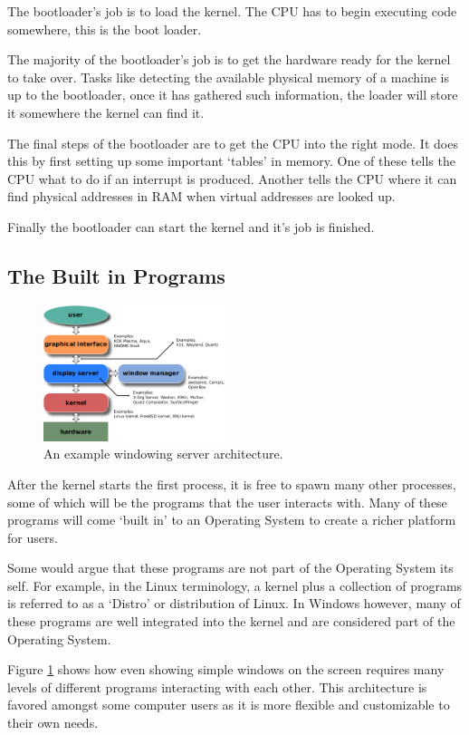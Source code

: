 \documentclass[a4paper]{report}
\begin{document}
The bootloader's job is to load the kernel. The CPU has to begin executing code somewhere, this is the boot loader.

The majority of the bootloader's job is to get the hardware ready for the kernel to take over. Tasks like detecting the available physical memory of a machine is up to the bootloader, once it has gathered such information, the loader will store it somewhere the kernel can find it.

The final steps of the bootloader are to get the CPU into the right mode. It does this by first setting up some important `tables' in memory. One of these tells the CPU what to do if an interrupt is produced. Another tells the CPU where it can find physical addresses in RAM when virtual addresses are looked up.

Finally the bootloader can start the kernel and it's job is finished.

\subsection{The Built in Programs}

\begin{figure}
\centering
\includegraphics[width=200px]{images/windowing}
\caption{An example windowing server architecture.}
\label{fig:theserver}
\end{figure}

After the kernel starts the first process, it is free to spawn many other processes, some of which will be the programs that the user interacts with. Many of these programs will come `built in' to an Operating System to create a richer platform for users.

Some would argue that these programs are not part of the Operating System its self. For example, in the Linux terminology, a kernel plus a collection of programs is referred to as a `Distro' or distribution of Linux. In Windows however, many of these programs are well integrated into the kernel and are considered part of the Operating System.

Figure \ref{fig:theserver} shows how even showing simple windows on the screen requires many levels of different programs interacting with each other. This architecture is favored amongst some computer users as it is more flexible and customizable to their own needs.
\end{document}

